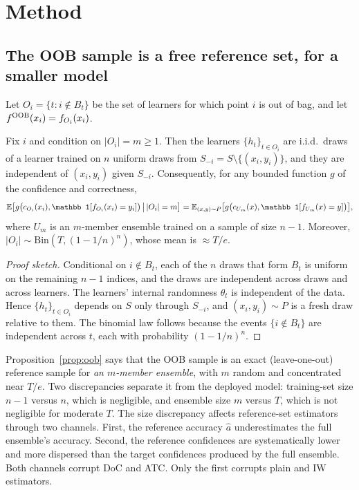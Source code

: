 \section{Method}
\label{sec:method}

\subsection{The OOB sample is a free reference set, for a smaller model}

Let $O_i=\{t: i\notin B_t\}$ be the set of learners for which point $i$ is out of bag, and let $f^{\mathrm{OOB}}(x_i)=f_{O_i}(x_i)$.

\begin{proposition}
\label{prop:oob}
Fix $i$ and condition on $|O_i|=m\ge1$. Then the learners $\{h_t\}_{t\in O_i}$ are i.i.d.\ draws of a learner trained on $n$ uniform draws from $S_{-i}=S\setminus\{(x_i,y_i)\}$, and they are independent of $(x_i,y_i)$ given $S_{-i}$. Consequently, for any bounded function $g$ of the confidence and correctness,
\[
\E\big[g\big(c_{O_i}(x_i),\mathbb 1[f_{O_i}(x_i)=y_i]\big)\,\big|\,|O_i|=m\big]=\E_{(x,y)\sim P}\big[g\big(c_{U_m}(x),\mathbb 1[f_{U_m}(x)=y]\big)\big],
\]
where $U_m$ is an $m$-member ensemble trained on a sample of size $n-1$. Moreover, $|O_i|\sim\mathrm{Bin}(T,(1-1/n)^n)$, whose mean is $\approx T/e$.
\end{proposition}
\begin{proof}[Proof sketch]
Conditional on $i\notin B_t$, each of the $n$ draws that form $B_t$ is uniform on the remaining $n-1$ indices, and the draws are independent across draws and across learners. The learners' internal randomness $\theta_t$ is independent of the data. Hence $\{h_t\}_{t\in O_i}$ depends on $S$ only through $S_{-i}$, and $(x_i,y_i)\sim P$ is a fresh draw relative to them. The binomial law follows because the events $\{i\notin B_t\}$ are independent across $t$, each with probability $(1-1/n)^n$.
\end{proof}

Proposition~\ref{prop:oob} says that the OOB sample is an exact (leave-one-out) reference sample for \emph{an $m$-member ensemble}, with $m$ random and concentrated near $T/e$. Two discrepancies separate it from the deployed model: training-set size $n-1$ versus $n$, which is negligible, and ensemble size $m$ versus $T$, which is not negligible for moderate $T$. The size discrepancy affects reference-set estimators through two channels. First, the reference accuracy $\hat a$ underestimates the full ensemble's accuracy. Second, the reference confidences are systematically lower and more dispersed than the target confidences produced by the full ensemble. Both channels corrupt DoC and ATC. Only the first corrupts plain and IW estimators.

